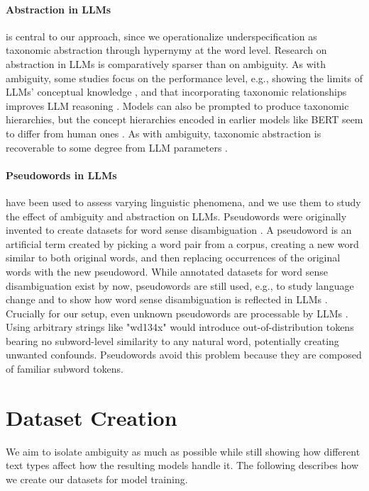 \documentclass[final]{clv2025}
\begin{document}
\paragraph{Abstraction in LLMs} is central to our approach, since we operationalize underspecification as taxonomic abstraction through hypernymy at the word level. Research on abstraction in LLMs is comparatively sparser than on ambiguity. As with ambiguity, some studies focus on the performance level, e.g., showing the limits of LLMs' conceptual knowledge \cite{peng-etal-2022-copen}, and that incorporating taxonomic relationships improves LLM reasoning \cite{TORRESMORENO2026114825}. Models can also be prompted to produce taxonomic hierarchies, but the concept hierarchies encoded in earlier models like BERT seem to differ from human ones \cite{dalvi2020discovering}. As with ambiguity, taxonomic abstraction is recoverable to some degree from LLM parameters \cite{regneri-etal-2024-detecting}.
\paragraph{Pseudowords in LLMs} have been used to assess varying linguistic phenomena, and we use them to study the effect of ambiguity and abstraction on LLMs. Pseudowords were originally invented to create datasets for word sense disambiguation \cite{schutze-1998-automatic}. A pseudoword is an artificial term created by picking a word pair from a corpus, creating a new word similar to both original words, and then replacing occurrences of the original words with the new pseudoword.
While annotated datasets for word sense disambiguation exist by now, pseudowords are still used, e.g., to study language change \cite{shoemark-etal-2019-room} and to show how word sense disambiguation is reflected in LLMs \cite{karidi-etal-2021-putting}.
Crucially for our setup, even unknown pseudowords are processable by LLMs \cite{10.1162/coli_a_00527}. Using arbitrary strings like "wd134x" would introduce out-of-distribution tokens bearing no subword-level similarity to any natural word, potentially creating unwanted confounds. Pseudowords avoid this problem because they are composed of familiar subword tokens.


\section{Dataset Creation} \label{sec:data}
We aim to isolate ambiguity as much as possible while still showing how different text types affect how the resulting models handle it. The following describes how we create our datasets for model training.
\end{document}

